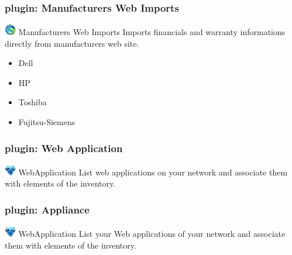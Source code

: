 \documentclass{beamer}
\begin{document}
\begin{frame}
    \frametitle{plugin: Manufacturers Web Imports}
    
    \begin{block}{\includegraphics[height=0.5cm]{./pics/plugins/manufacturer.jpg} Manufacturers Web Imports}
        Imports financials and warranty informations directly from manufacturers web site.
        \begin{itemize}
            \item Dell 
            \item HP
            \item Toshiba
            \item Fujitsu-Siemens 
        \end{itemize}
    \end{block}

\end{frame}

\begin{frame}
    \frametitle{plugin: Web Application}
    
    \begin{block}{\includegraphics[height=0.5cm]{./pics/plugins/webapp.jpg} WebApplication}
        List web applications on your network and associate them with elements of the inventory.
    \end{block}

\end{frame}


\begin{frame}
    \frametitle{plugin: Appliance}
    
    \begin{block}{\includegraphics[height=0.5cm]{./pics/plugins/webapp.jpg} WebApplication}
        List your Web applications of your network and associate them with elements of the inventory.
    \end{block}

\end{frame}
\end{document}
